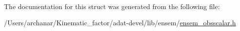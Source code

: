 The documentation for this struct was generated from the following file\+:\begin{DoxyCompactItemize}
\item 
/\+Users/archanar/\+Kinematic\+\_\+factor/adat-\/devel/lib/ensem/\mbox{\hyperlink{adat-devel_2lib_2ensem_2ensem__obsscalar_8h}{ensem\+\_\+obsscalar.\+h}}\end{DoxyCompactItemize}

